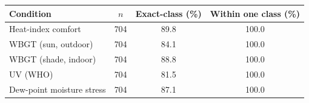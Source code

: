 \begin{tabular}{lccc}
\toprule
Condition & $n$ & Exact-class (\%) & Within one class (\%) \\
\midrule
Heat-index comfort         & 704 & 89.8 & 100.0 \\
WBGT (sun, outdoor)        & 704 & 84.1 & 100.0 \\
WBGT (shade, indoor)       & 704 & 88.8 & 100.0 \\
UV (WHO)                   & 704 & 81.5 & 100.0 \\
Dew-point moisture stress  & 704 & 87.1 & 100.0 \\
\bottomrule
\end{tabular}
